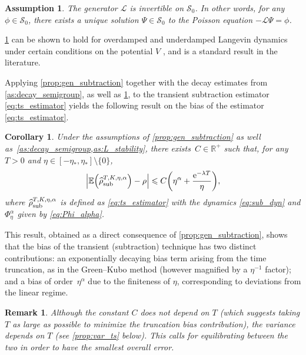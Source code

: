 \documentclass[11pt]{article}
\newcommand{\E}{\mathbb{E}}
\newcommand{\R}{\mathbb{R}}
\newcommand{\e}{\mathrm{e}}
\renewcommand{\L}{\mathcal{L}}
\renewcommand{\S}{\mathscr{S}}
\renewcommand{\leq}{\leqslant}
\DeclarePairedDelimiter\paren{\lparen}{\rparen}
\newtheorem{corollary}{Corollary}
\newtheorem{assumption}{Assumption}
\newtheorem{remark}{Remark}
\theoremstyle{definition}
\newcommand{\estTmp}{\widehat{\rho}}
\newcommand{\aTSest}{\estTmp^{T,K,\eta,\alpha}_{\rm sub}} %
\begin{document}
\begin{assumption}
\label{as:L_stability}
The generator $\L$ is invertible on $\S_0$. In other words, for any $\phi\in\S_0$, there exists a unique solution $\Psi \in \S_0$ to the Poisson equation $-\L\Psi = \phi$.
\end{assumption}

\cref{as:L_stability} can be shown to hold for overdamped and underdamped Langevin dynamics under certain conditions on the potential $V$ \cite{talay2002,kopec2014,kopec2015}, and is a standard result in the literature.

Applying \cref{prop:gen_subtraction} together with the decay estimates from \cref{as:decay_semigroup}, as well as \cref{as:L_stability}, to the transient subtraction estimator \eqref{eq:ts_estimator} yields the following result on the bias of the estimator \eqref{eq:ts_estimator}.

\begin{corollary}
\label{cor:gk_equiv}
Under the assumptions of \cref{prop:gen_subtraction} as well as~\cref{as:decay_semigroup,as:L_stability}, there exists~$C\in\R^+$ such that, for any $T>0$ and $\eta \in [-\eta_*, \eta_*] \setminus \{0\}$,
\begin{equation}
	\left|\E\paren*{\aTSest} - \rho\right| \leq C\paren*{\eta^\alpha + \frac{\e^{-\lambda T}}{\eta}},
\label{eq:gk_cor_statement}
\end{equation}
where $\aTSest$ is defined as \eqref{eq:ts_estimator} with the dynamics \eqref{eq:sub_dyn} and $\Phi_\eta^\alpha$ given by \eqref{eq:Phi_alpha}.
\end{corollary}

This result, obtained as a direct consequence of \cref{prop:gen_subtraction}, shows that the bias of the transient (subtraction) technique has two distinct contributions: an exponentially decaying bias term arising from the time truncation, as in the Green--Kubo method (however magnified by a $\eta^{-1}$ factor); and a bias of order~$\eta^\alpha$ due to the finiteness of $\eta$, corresponding to deviations from the linear regime.

\begin{remark}
	Although the constant $C$ does not depend on $T$ (which suggests taking $T$ as large as possible to minimize the truncation bias contribution), the variance depends on $T$ (see \cref{prop:var_ts} below). This calls for equilibrating between the two in order to have the smallest overall error.
\end{remark}
\end{document}
